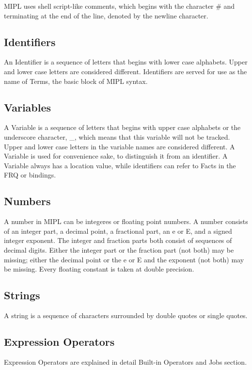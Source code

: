 \documentclass[prodmode,acmtecs]{acmsmall}
\begin{document}
MIPL uses shell script-like comments, which begins with the character
\# and terminating at the end of the line, denoted by the newline character.
\medskip

\subsection{Identifiers}

An Identifier is a sequence of letters that begins with lower case alphabets.
Upper and lower case letters are considered different.   Identifiers are
served for use as the name of Terms, the basic block of MIPL syntax.
\medskip

\subsection{Variables}

A Variable is a sequence of letters that begins with upper case alphabets
or the underscore character, \_, which means that this variable will not
be tracked.  Upper and lower case letters in the variable names are
considered different. A Variable is used for convenience sake, to distinguish
it from an identifier. A Variable always has a location value, while identifiers
can refer to Facts in the FRQ or bindings.
\medskip

\subsection{Numbers}

A number in MIPL can be integeres or floating point numbers.  A number consists of
an integer part, a decimal point, a fractional part, an e or E, and a signed 
integer exponent. The integer and fraction parts both consist of sequences of decimal
digits.
Either the integer part or the fraction part (not both) may be missing; either 
the decimal point or the e or E and the exponent (not both) may be missing.
Every floating constant is taken at double precision.
\medskip

\subsection{Strings}

A string is a sequence of characters surrounded by double quotes or single
quotes.
\medskip

\subsection{Expression Operators}
Expression Operators are explained in detail Built-in Operators and Jobs section.
\medskip
\end{document}
